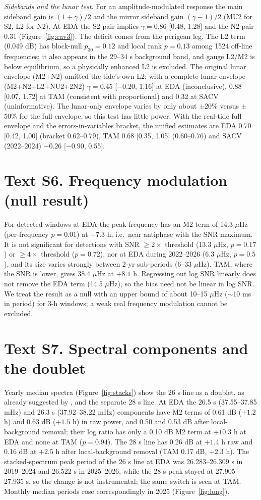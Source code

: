 \documentclass[11pt]{article}
\begin{document}
\textit{Sidebands and the lunar test.} For an amplitude-modulated response the main sideband gain is $(1+\gamma)/2$ and the mirror sideband gain $(\gamma-1)/2$ (MU2 for S2, L2 for N2). At EDA the S2 pair implies $\gamma=0.86$ [0.48, 1.28] and the N2 pair 0.31 (Figure~\ref{fig:cav3}). The deficit comes from the perigean leg. The L2 term (0.049 dB) has block-null $p_{30}=0.12$ and local rank $p=0.13$ among 1524 off-line frequencies; it also appears in the 29--34 s background band, and gauge L2/M2 is below equilibrium, so a physically enhanced L2 is excluded. The original lunar envelope (M2+N2) omitted the tide's own L2; with a complete lunar envelope (M2+N2+L2+NU2+2N2) $\gamma=0.45$ [$-0.20$, 1.16] at EDA (inconclusive), 0.88 [0.07, 1.72] at TAM (consistent with proportional) and 0.32 at SACV (uninformative). The lunar-only envelope varies by only about $\pm$20\% versus $\pm$50\% for the full envelope, so this test has little power. With the real-tide full envelope and the errors-in-variables bracket, the unified estimates are EDA 0.70 [0.42, 1.00] (bracket 0.62--0.79), TAM 0.68 [0.35, 1.05] (0.60--0.76) and SACV (2022--2024) $-0.26$ [$-0.90$, 0.55].

\section*{Text S6. Frequency modulation (null result)}
For detected windows at EDA the peak frequency has an M2 term of 14.3 $\mu$Hz (per-frequency $p=0.01$) at $+7.3$ h, i.e.\ near antiphase with the SNR maximum. It is not significant for detections with SNR $\ge2\times$ threshold (13.3 $\mu$Hz, $p=0.17$) or $\ge4\times$ threshold ($p=0.72$), nor at EDA during 2022--2026 (6.3 $\mu$Hz, $p=0.5$), and its size varies strongly between 2-yr sub-periods (6--33 $\mu$Hz). TAM, where the SNR is lower, gives 38.4 $\mu$Hz at $+8.1$ h. Regressing out log SNR linearly does not remove the EDA term (14.5 $\mu$Hz), so the bias need not be linear in log SNR. We treat the result as a null with an upper bound of about 10--15 $\mu$Hz ($\sim$10 ms in period) for 3-h windows; a weak real frequency modulation cannot be excluded.

\section*{Text S7. Spectral components and the doublet}
Yearly median spectra (Figure~\ref{fig:stacks}) show the 26 s line as a doublet, as already suggested by \citet{holcomb1998}, and the separate 28 s line. At EDA the 26.5 s (37.55--37.85 mHz) and 26.3 s (37.92--38.22 mHz) components have M2 terms of 0.61 dB ($+1.2$ h) and 0.63 dB ($+1.5$ h) in raw power, and 0.50 and 0.53 dB after local-background removal; their log ratio has only a 0.10 dB M2 term at $+10.3$ h at EDA and none at TAM ($p=0.94$). The 28 s line has 0.26 dB at $+1.4$ h raw and 0.16 dB at $+2.5$ h after local-background removal (TAM 0.17 dB, $+2.3$ h). The stacked-spectrum peak period of the 26 s line at EDA was 26.283--26.309 s in 2019--2024 and 26.522 s in 2025--2026, while the 28 s peak stayed at 27.905--27.935 s, so the change is not instrumental; the same switch is seen at TAM. Monthly median periods rose correspondingly in 2025 (Figure~\ref{fig:long}).
\end{document}
